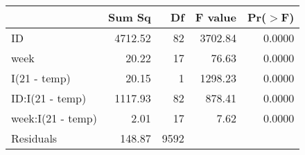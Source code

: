 \begin{table}[ht]
\centering
\begin{tabular}{lrrrr}
  \hline
 & Sum Sq & Df & F value & Pr($>$F) \\ 
  \hline
ID & 4712.52 & 82 & 3702.84 & 0.0000 \\ 
  week & 20.22 & 17 & 76.63 & 0.0000 \\ 
  I(21 - temp) & 20.15 & 1 & 1298.23 & 0.0000 \\ 
  ID:I(21 - temp) & 1117.93 & 82 & 878.41 & 0.0000 \\ 
  week:I(21 - temp) & 2.01 & 17 & 7.62 & 0.0000 \\ 
  Residuals & 148.87 & 9592 &  &  \\ 
   \hline
\end{tabular}
\end{table}
